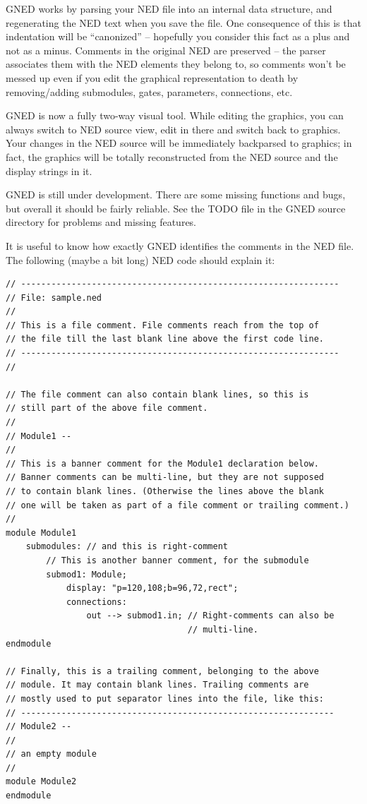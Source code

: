 GNED works by parsing your NED file into an internal data structure,
and regenerating the NED text when you save the file. One consequence
of this is that indentation will be ``canonized''
-- hopefully you consider this fact as a plus and not as a minus.
Comments in the original NED are preserved -- the parser associates
them with the NED elements they belong to, so comments won't
be messed up even if you edit the graphical representation to
death by removing/adding submodules, gates, parameters, connections,
etc.

GNED is now a fully two-way visual tool. While editing the graphics,
you can always switch to NED source view, edit in there and switch
back to graphics. Your changes in the NED source will be immediately
backparsed to graphics; in fact, the graphics will be totally
reconstructed from the NED source and the display strings in
it.

GNED is still under development. There are some missing functions
and bugs, but overall it should be fairly reliable. See the TODO
file in the GNED source directory for problems and missing features.




It is useful to know how exactly GNED identifies the comments
in the NED file. The following (maybe a bit long) NED code should
explain it:

\begin{verbatim}
// ---------------------------------------------------------------
// File: sample.ned
//
// This is a file comment. File comments reach from the top of
// the file till the last blank line above the first code line.
// ---------------------------------------------------------------
//

// The file comment can also contain blank lines, so this is
// still part of the above file comment.
//
// Module1 --
//
// This is a banner comment for the Module1 declaration below.
// Banner comments can be multi-line, but they are not supposed
// to contain blank lines. (Otherwise the lines above the blank
// one will be taken as part of a file comment or trailing comment.)
//
module Module1
    submodules: // and this is right-comment
        // This is another banner comment, for the submodule
        submod1: Module;
            display: "p=120,108;b=96,72,rect";
            connections:
                out --> submod1.in; // Right-comments can also be
                                    // multi-line.
endmodule

// Finally, this is a trailing comment, belonging to the above
// module. It may contain blank lines. Trailing comments are
// mostly used to put separator lines into the file, like this:
// --------------------------------------------------------------
// Module2 --
//
// an empty module
//
module Module2
endmodule
\end{verbatim}


